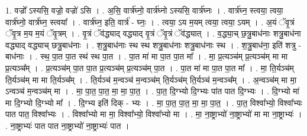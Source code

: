 \documentclass[17pt]{extarticle}
\begin{document}
1. वज्रो᳚ ऽस्यसि॒ वज्रो॒ वज्रो॑ ऽसि । . अ॒सि॒ वार्त्र॑घ्नो॒ वार्त्र॑घ्नो ऽस्यसि॒ वार्त्र॑घ्नः । . वार्त्र॑घ्न॒ स्त्वया॒ त्वया॒ वार्त्र॑घ्नो॒ वार्त्र॑घ्न॒ स्त्वया᳚ । . वार्त्र॑घ्न॒ इति॒ वार्त्र॑ - घ्नः॒ । . त्वया॒ ऽय म॒यम् त्वया॒ त्वया॒ ऽयम् । . अ॒यं ॅवृ॒त्रं ॅवृ॒त्र म॒य म॒यं ॅवृ॒त्रम् । . वृ॒त्रं ॅव॑द्ध्याद् वद्ध्याद् वृ॒त्रं ॅवृ॒त्रं ॅव॑द्ध्यात् । . व॒द्ध्या॒च् छ॒त्रु॒बाध॑नाः शत्रु॒बाध॑ना वद्ध्याद् वद्ध्याच् छत्रु॒बाध॑नाः । . श॒त्रु॒बाध॑नाः स्थ स्थ शत्रु॒बाध॑नाः शत्रु॒बाध॑नाः स्थ । . श॒त्रु॒बाध॑ना॒ इति॑ शत्रु - बाध॑नाः । . स्थ॒ पा॒त पा॒त स्थ॑ स्थ पा॒त । . पा॒त मा॑ मा पा॒त पा॒त मा᳚ । . मा॒ प्र॒त्यञ्च॑म् प्र॒त्यञ्च॑म् मा मा प्र॒त्यञ्च᳚म् । . प्र॒त्यञ्च॑म् पा॒त पा॒त प्र॒त्यञ्च॑म् प्र॒त्यञ्च॑म् पा॒त । . पा॒त मा॑ मा पा॒त पा॒त मा᳚ । . मा॒ ति॒र्यञ्च॑म् ति॒र्यञ्च॑म् मा मा ति॒र्यञ्च᳚म् । . ति॒र्यञ्च॑ म॒न्वञ्च॑ म॒न्वञ्च॑म् ति॒र्यञ्च॑म् ति॒र्यञ्च॑ म॒न्वञ्च᳚म् । . अ॒न्वञ्च॑म् मा मा॒ ऽन्वञ्च॑ म॒न्वञ्च॑म् मा । . मा॒ पा॒त॒ पा॒त॒ मा॒ मा॒ पा॒त॒ । . पा॒त॒ दि॒ग्भ्यो दि॒ग्भ्यः पा॑त पात दि॒ग्भ्यः । . दि॒ग्भ्यो मा॑ मा दि॒ग्भ्यो दि॒ग्भ्यो मा᳚ । . दि॒ग्भ्य इति॑ दिक् - भ्यः । . मा॒ पा॒त॒ पा॒त॒ मा॒ मा॒ पा॒त॒ । . पा॒त॒ विश्वा᳚भ्यो॒ विश्वा᳚भ्यः पात पात॒ विश्वा᳚भ्यः । . विश्वा᳚भ्यो मा मा॒ विश्वा᳚भ्यो॒ विश्वा᳚भ्यो मा । . मा॒ ना॒ष्ट्राभ्यो॑ ना॒ष्ट्राभ्यो॑ मा मा ना॒ष्ट्राभ्यः॑ । . ना॒ष्ट्राभ्यः॑ पात पात ना॒ष्ट्राभ्यो॑ ना॒ष्ट्राभ्यः॑ पात । \newline
\end{document}
